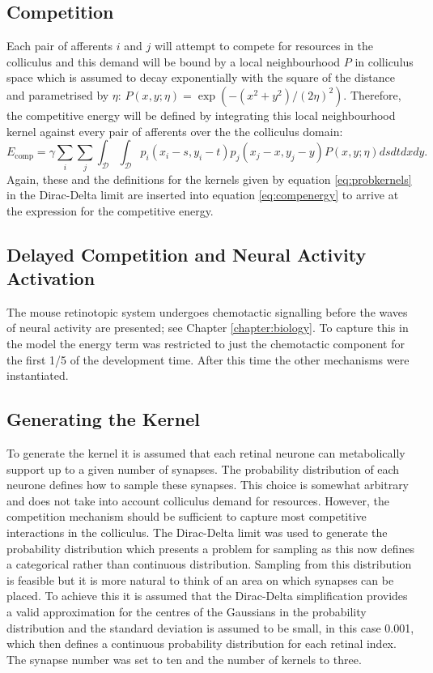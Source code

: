 \subsection{Competition}
Each pair of afferents $i$ and $j$ will attempt to compete for resources in the colliculus and this demand will be bound by a local neighbourhood $P$ in colliculus space which is assumed to decay exponentially with the square of the distance and parametrised by $\eta$: $P(x,y; \eta) = \exp(-(x^2+y^2)/(2\eta)^2)$. Therefore, the competitive energy will be defined by integrating this local neighbourhood kernel against every pair of afferents over the the colliculus domain:
\begin{equation}
\label{eq:compenergy}
E_\text{comp} = \gamma \sum_i \sum_j \int_{\mathcal{D}} \int_{\mathcal{D}}p_i(x_i - s, y_i - t)p_j(x_j-x,y_j-y) P(x,y; \eta) ds dt dx dy .
\end{equation}
Again, these and the definitions for the kernels given by equation \ref{eq:probkernels} in the Dirac-Delta limit are inserted into equation \ref{eq:compenergy} to arrive at the expression for the competitive energy.
\subsection{Delayed Competition and Neural Activity Activation}
The mouse retinotopic system undergoes chemotactic signalling before the waves of neural activity are presented; see Chapter \ref{chapter:biology}. To capture this in the model the energy term was restricted to just the chemotactic component for the first 1/5 of the development time. After this time the other mechanisms were instantiated.
\subsection{Generating the Kernel}
To generate the kernel it is assumed that each retinal neurone can metabolically support up to a given number of synapses. The probability distribution of each neurone defines how to sample these synapses. This choice is somewhat arbitrary and does not take into account colliculus demand for resources.  However, the competition mechanism should be sufficient to capture most competitive interactions in the colliculus. The Dirac-Delta limit was used to generate the probability distribution which presents a problem for sampling as this now defines a categorical rather than continuous distribution. Sampling from this distribution is feasible but it is more natural to think of an area on which synapses can be placed. To achieve this it is assumed that the Dirac-Delta simplification provides a valid approximation for the centres of the Gaussians in the probability distribution and the standard deviation is assumed to be small, in this case 0.001, which then defines a continuous probability distribution for each retinal index. The synapse number was set to ten and the number of kernels to three. 
